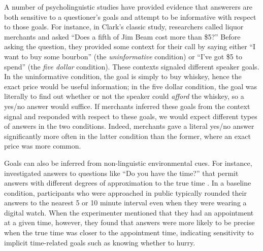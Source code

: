 \documentclass[12pt, floatsintext, jou]{apa6}
\begin{document}
A number of psycholinguistic studies have provided evidence that answerers are both sensitive to a questioner's goals and attempt to be informative with respect to those goals.
For instance, in Clark's \citeyear{Clark79_IndirectSpeechActs} classic study, researchers called liquor merchants and asked ``Does a fifth of Jim Beam cost more than \$5?'' Before asking the question, they provided some context for their call by saying either ``I want to buy some bourbon'' (the \emph{uninformative} condition) or ``I've got \$5 to spend'' (the \emph{five dollar} condition). 
These contexts signaled different speaker goals. In the uninformative condition, the goal is simply to buy whiskey, hence the exact price would be useful information; in the five dollar condition, the goal was literally to find out whether or not the speaker could \emph{afford} the whiskey, so a yes/no answer would suffice. 
If merchants inferred these goals from the context signal and responded with respect to these goals, we would expect different types of answers in the two conditions. Indeed, merchants gave a literal yes/no answer significantly more often in the latter condition than the former, where an exact price was more common. 

Goals can also be inferred from non-linguistic environmental cues. For instance,  investigated answers to questions like ``Do you have the time?'' that permit answers with different degrees of approximation to the true time \cite<see also>{GibbsBryant08_OptimalRelevance}. In a baseline condition, participants who were approached in public typically rounded their answers to the nearest 5 or 10 minute interval even when they were wearing a digital watch. 
When the experimenter mentioned that they had an appointment at a given time, however, they found that answers were more likely to be precise when the true time was closer to the appointment time, indicating sensitivity to implicit time-related goals such as knowing whether to hurry.  
\end{document}
